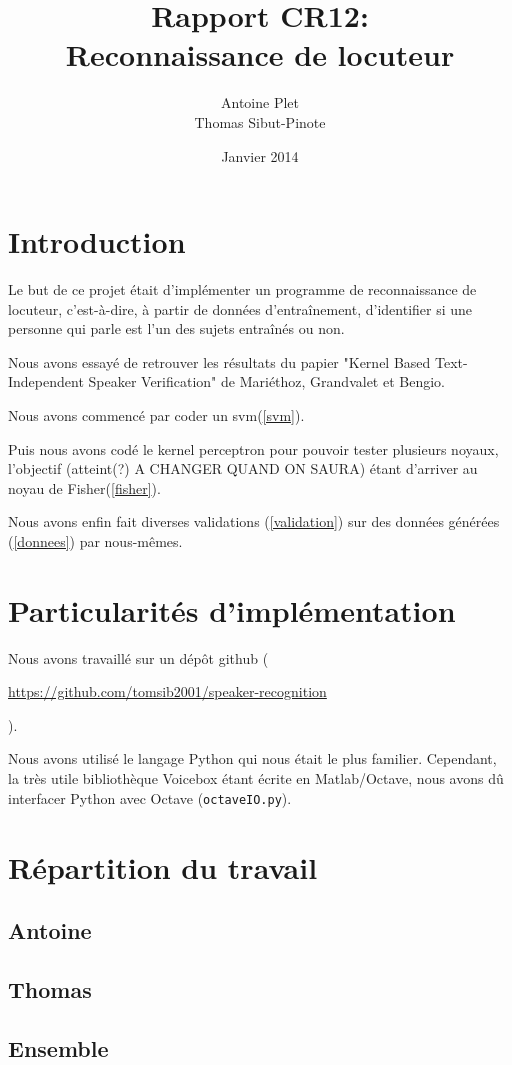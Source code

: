 \documentclass{article}
\title{Rapport CR12:\\
Reconnaissance de locuteur}
\author{Antoine Plet\\
Thomas Sibut-Pinote}
\date{Janvier 2014}
\let\urlorig\url
\renewcommand{\url}[1]{%
  \begin{otherlanguage}{english}\urlorig{#1}\end{otherlanguage}%
}
\begin{document}
\maketitle

\section{Introduction}
Le but de ce projet était d'implémenter un programme de reconnaissance de locuteur, c'est-à-dire, à partir de données d'entraînement, d'identifier si une personne qui parle est l'un des sujets entraînés ou non.

Nous avons essayé de retrouver les résultats du papier "Kernel Based Text-Independent Speaker Verification" de Mariéthoz, Grandvalet et Bengio.

Nous avons commencé par coder un svm(\ref{svm}).

Puis nous avons codé le kernel perceptron pour pouvoir tester plusieurs noyaux, l'objectif (atteint(?) A CHANGER QUAND ON SAURA) étant d'arriver au noyau de Fisher(\ref{fisher}).

Nous avons enfin fait diverses validations (\ref{validation}) sur des données générées (\ref{donnees}) par nous-mêmes.

\section{Particularités d'implémentation}
\label{implémentation}
Nous avons travaillé sur un dépôt github (\url{https://github.com/tomsib2001/speaker-recognition}).

Nous avons utilisé le langage Python qui nous était le plus familier. Cependant, la très utile bibliothèque Voicebox étant écrite en Matlab/Octave, nous avons dû interfacer Python avec Octave (\texttt{octaveIO.py}).


\section{Répartition du travail}
\label{répartition}
\subsection{Antoine}
\subsection{Thomas}
\subsection{Ensemble}
\end{document}
